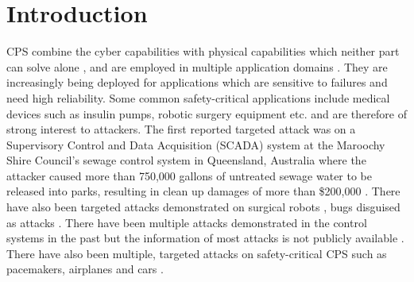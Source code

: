 
\chapter{Introduction }
\label{ch:Chapter1}
\ac{CPS} combine the cyber capabilities with physical capabilities which neither part can solve alone \cite{Platzer18}, and are employed in multiple application domains \cite{10.1145/2038642.2038685}\cite{10.1145/1837274.1837463} \cite{6051465}. They are increasingly being deployed for applications which are sensitive to failures and need high reliability. 
Some common safety-critical applications include medical devices such as insulin pumps, robotic  surgery equipment etc. and are therefore of strong interest to attackers.
The first reported targeted attack was on a Supervisory Control and Data Acquisition (SCADA) system \cite{article22} at the Maroochy Shire Council’s sewage control system in Queensland, Australia where the attacker caused more than 750,000 gallons of untreated sewage water to be released into parks, resulting in clean up damages of more than \$200,000 \cite{10.1016/j.adhoc.2009.04.012}.
There have also been targeted attacks demonstrated on surgical robots \cite{7579758}, bugs disguised as attacks \cite{242054}. There have been multiple attacks demonstrated in the control systems in the past but the information of most attacks is not publicly available \cite{doi:10.1080/13518040590969785}.
There have also been multiple, targeted attacks on safety-critical CPS such as pacemakers\cite{4531149}, airplanes \cite{217595} and  cars \cite{10.5555/1929820.1929848}.
\\

